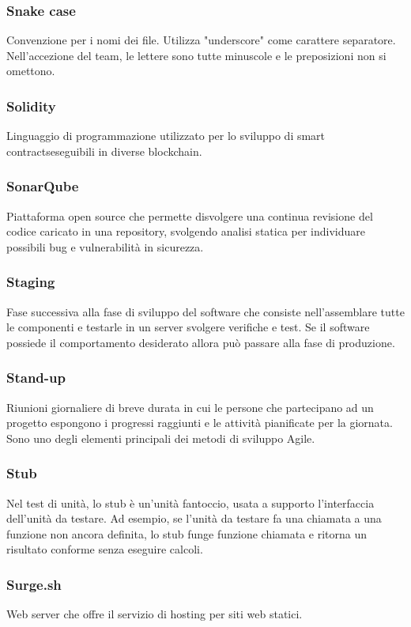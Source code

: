\subsubsection*{Snake case}
Convenzione per i nomi dei file. Utilizza "underscore" come carattere separatore. Nell'accezione del team, le lettere sono tutte minuscole e le preposizioni non si omettono.

\subsubsection*{Solidity}
Linguaggio di programmazione utilizzato per lo sviluppo di smart contracts\glosp eseguibili in diverse blockchain\glo.

\subsubsection*{SonarQube}
Piattaforma open source che permette disvolgere una continua revisione del codice caricato in una repository, svolgendo analisi statica per individuare possibili bug e vulnerabilità in sicurezza.

\subsubsection*{Staging}
Fase successiva alla fase di sviluppo del software che consiste nell'assemblare tutte le componenti e testarle in un server svolgere verifiche e test. Se il software possiede il comportamento desiderato allora può passare alla fase di produzione.

\subsubsection*{Stand-up}
Riunioni giornaliere di breve durata in cui le persone che partecipano ad un progetto espongono i progressi raggiunti e le attività pianificate per la giornata. Sono uno degli elementi principali dei metodi di sviluppo Agile\glo. 

\subsubsection*{Stub}
Nel test di unità, lo stub è un'unità fantoccio, usata a supporto l'interfaccia dell'unità da testare. Ad esempio, se l'unità da testare fa una chiamata a una funzione non ancora definita, lo stub funge funzione chiamata e ritorna un risultato conforme senza eseguire calcoli.

\subsubsection*{Surge.sh}
Web server che offre il servizio di hosting per siti web statici.

